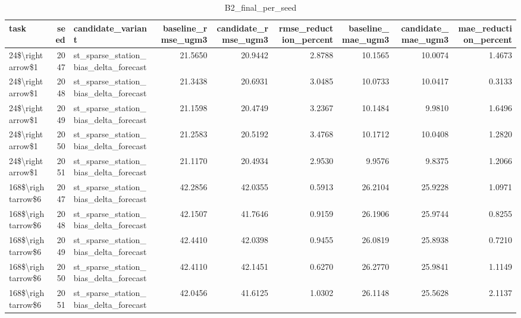 \begin{table}
\caption{B2_final_per_seed}
\label{tab:B2_final_per_seed}
\begin{tabular}{lrlrrrrrr}
\toprule
task & seed & candidate\_variant & baseline\_rmse\_ugm3 & candidate\_rmse\_ugm3 & rmse\_reduction\_percent & baseline\_mae\_ugm3 & candidate\_mae\_ugm3 & mae\_reduction\_percent \\
\midrule
24\$\textbackslash rightarrow\$1 & 2047 & st\_sparse\_station\_bias\_delta\_forecast & 21.5650 & 20.9442 & 2.8788 & 10.1565 & 10.0074 & 1.4673 \\
24\$\textbackslash rightarrow\$1 & 2048 & st\_sparse\_station\_bias\_delta\_forecast & 21.3438 & 20.6931 & 3.0485 & 10.0733 & 10.0417 & 0.3133 \\
24\$\textbackslash rightarrow\$1 & 2049 & st\_sparse\_station\_bias\_delta\_forecast & 21.1598 & 20.4749 & 3.2367 & 10.1484 & 9.9810 & 1.6496 \\
24\$\textbackslash rightarrow\$1 & 2050 & st\_sparse\_station\_bias\_delta\_forecast & 21.2583 & 20.5192 & 3.4768 & 10.1712 & 10.0408 & 1.2820 \\
24\$\textbackslash rightarrow\$1 & 2051 & st\_sparse\_station\_bias\_delta\_forecast & 21.1170 & 20.4934 & 2.9530 & 9.9576 & 9.8375 & 1.2066 \\
168\$\textbackslash rightarrow\$6 & 2047 & st\_sparse\_station\_bias\_delta\_forecast & 42.2856 & 42.0355 & 0.5913 & 26.2104 & 25.9228 & 1.0971 \\
168\$\textbackslash rightarrow\$6 & 2048 & st\_sparse\_station\_bias\_delta\_forecast & 42.1507 & 41.7646 & 0.9159 & 26.1906 & 25.9744 & 0.8255 \\
168\$\textbackslash rightarrow\$6 & 2049 & st\_sparse\_station\_bias\_delta\_forecast & 42.4410 & 42.0398 & 0.9455 & 26.0819 & 25.8938 & 0.7210 \\
168\$\textbackslash rightarrow\$6 & 2050 & st\_sparse\_station\_bias\_delta\_forecast & 42.4110 & 42.1451 & 0.6270 & 26.2770 & 25.9841 & 1.1149 \\
168\$\textbackslash rightarrow\$6 & 2051 & st\_sparse\_station\_bias\_delta\_forecast & 42.0456 & 41.6125 & 1.0302 & 26.1148 & 25.5628 & 2.1137 \\
\bottomrule
\end{tabular}
\end{table}
